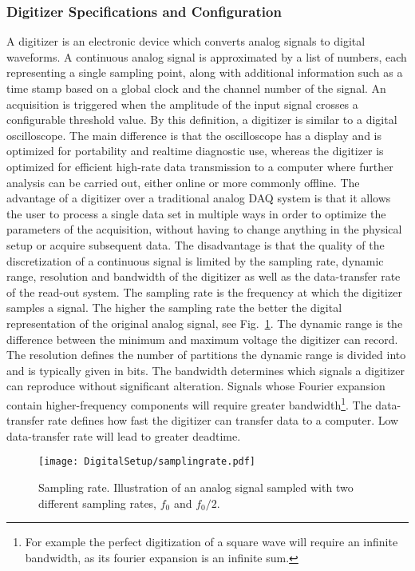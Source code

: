 \documentclass[main.tex]{subfiles}
\begin{document}
\subsubsection{Digitizer Specifications and Configuration}
A digitizer is an electronic device which converts analog signals to digital waveforms. A continuous analog signal is approximated by a list of numbers, each representing a single sampling point, along with additional information such as a time stamp based on a global clock and the channel number of the signal. An acquisition is triggered when the amplitude of the input signal crosses a configurable threshold value.
By this definition, a digitizer is similar to a digital oscilloscope. The main difference is that the oscilloscope has a display and is optimized for portability and realtime diagnostic use, whereas the digitizer is optimized for efficient high-rate data transmission to a computer where further analysis can be carried out, either online or more commonly offline.
The advantage of a digitizer over a traditional analog DAQ system is that it allows the user to process a single data set in multiple ways in order to optimize the parameters of the acquisition, without having to change anything in the physical setup or acquire subsequent data. The disadvantage is that the quality of the discretization of a continuous signal is limited by the sampling rate, dynamic range, resolution and bandwidth of the digitizer as well as the data-transfer rate of the read-out system. 
The sampling rate is the frequency at which the digitizer samples a signal. The higher the sampling rate the better the digital representation of the original analog signal, see Fig.~\ref{fig:samplingrate}.
The dynamic range is the difference between the minimum and maximum voltage the digitizer can record. The resolution defines the number of partitions the dynamic range is divided into and is typically given in bits. The bandwidth determines which signals a digitizer can reproduce without significant alteration. Signals whose Fourier expansion contain higher-frequency components will require greater bandwidth\footnote{For example the perfect digitization of a square wave will require an infinite bandwidth, as its fourier expansion is an infinite sum.}. The data-transfer rate defines how fast the digitizer can transfer data to a computer. Low data-transfer rate will lead to greater deadtime.

\begin{figure}[ht]
	\centering
    	\texttt{[image: DigitalSetup/samplingrate.pdf]}
        \caption[Sampling rate.]{Sampling rate. Illustration of an analog signal sampled with two different sampling rates, $f_0$ and $f_0/2$.}
	    \label{fig:samplingrate} 
\end{figure}
\end{document}
